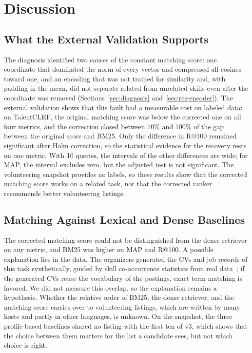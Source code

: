 \documentclass[CHICAGO]{USG}
\begin{document}
\section{Discussion}
\label{sec:discussion}

\subsection{What the External Validation Supports}
\label{sec:disc-support}
The diagnosis identified two causes of the constant matching score: one coordinate that dominated the norm of every vector and compressed all cosines toward one, and an encoding that was not trained for similarity and, with padding in the mean, did not separate related from unrelated skills even after the coordinate was removed (Sections~\ref{sec:diagnosis} and~\ref{sec:res-encoder}). The external validation shows that this fault had a measurable cost on labeled data: on TalentCLEF, the original matching score was below the corrected one on all four metrics, and the correction closed between 70\% and 100\% of the gap between the original score and BM25. %
Only the difference in R@100 remained significant after Holm correction, so the statistical evidence for the recovery rests on one metric. With 10 queries, the intervals of the other differences are wide; for MAP, the interval excludes zero, but the adjusted test is not significant. %
The volunteering snapshot provides no labels, so these results show that the corrected matching score works on a related task, not that the corrected ranker recommends better volunteering listings.

\subsection{Matching Against Lexical and Dense Baselines}
\label{sec:disc-baselines}
The corrected matching score could not be distinguished from the dense retriever on any metric, and BM25 was higher on MAP and R@100. %
A possible explanation lies in the data. The organizers generated the CVs and job records of this task synthetically, guided by skill co-occurrence statistics from real data~\citep{gasco2026overview}; if the generated CVs reuse the vocabulary of the postings, exact term matching is favored. We did not measure this overlap, so the explanation remains a hypothesis. Whether the relative order of BM25, the dense retriever, and the matching score carries over to volunteering listings, which are written by many hosts and partly in other languages, is unknown. On the snapshot, the three profile-based baselines shared no listing with the first ten of v3, which shows that the choice between them matters for the list a candidate sees, but not which choice is right. %
\end{document}
